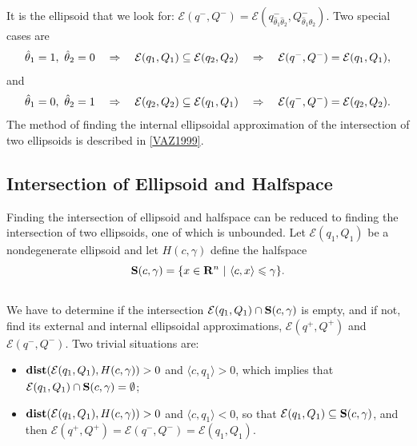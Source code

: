 \documentclass[letterpaper,10pt,english]{sphinxmanual}
\begin{document}
It is the ellipsoid that we look for:
${\mathcal E}(q^-,Q^-)={\mathcal E}(q^-_{\hat{\theta}_1\hat{\theta}_2},Q^-_{\hat{\theta}_1\hat{\theta}_2})$.
Two special cases are
\begin{gather}
\begin{split}\hat{\theta}_1=1, ~ \hat{\theta}_2=0 ~~~ \Rightarrow ~~~
{\mathcal E}(q_1,Q_1)\subseteq{\mathcal E}(q_2,Q_2) ~~~ \Rightarrow ~~~
{\mathcal E}(q^-,Q^-)={\mathcal E}(q_1,Q_1),\end{split}\notag
\end{gather}
and
\begin{gather}
\begin{split}\hat{\theta}_1=0, ~ \hat{\theta}_2=1 ~~~ \Rightarrow ~~~
{\mathcal E}(q_2,Q_2)\subseteq{\mathcal E}(q_1,Q_1) ~~~ \Rightarrow ~~~
{\mathcal E}(q^-,Q^-)={\mathcal E}(q_2,Q_2).\end{split}\notag
\end{gather}
The method of finding the internal ellipsoidal approximation of the
intersection of two ellipsoids is described in {\hyperref[chap_ellcalc:vaz1999]{{[}VAZ1999{]}}}.


\subsection{Intersection of Ellipsoid and Halfspace}
\label{chap_ellcalc:intersection-of-ellipsoid-and-halfspace}
Finding the intersection of ellipsoid and halfspace can be reduced to
finding the intersection of two ellipsoids, one of which is unbounded.
Let ${\mathcal E}(q_1,Q_1)$ be a nondegenerate ellipsoid and let
$H(c,\gamma)$ define the halfspace
\begin{gather}
\begin{split}{\bf S}(c,\gamma) = \{x\in{\bf R}^n ~|~ \langle c,x\rangle\leqslant\gamma\}.\end{split}\notag\\\begin{split}\end{split}\notag
\end{gather}
We have to determine if the intersection
${\mathcal E}(q_1,Q_1)\cap{\bf S}(c,\gamma)$ is empty, and if not,
find its external and internal ellipsoidal approximations,
${\mathcal E}(q^+,Q^+)$ and ${\mathcal E}(q^-,Q^-)$. Two
trivial situations are:
\begin{itemize}
\item {} 
${\bf dist}({\mathcal E}(q_1,Q_1),H(c,\gamma))>0$ and
$\langle c, q_1\rangle>0$, which implies that
${\mathcal E}(q_1,Q_1)\cap{\bf S}(c,\gamma)=\emptyset$;

\item {} 
${\bf dist}({\mathcal E}(q_1,Q_1),H(c,\gamma))>0$ and
$\langle c, q_1\rangle<0$, so that
${\mathcal E}(q_1,Q_1)\subseteq{\bf S}(c,\gamma)$, and then
${\mathcal E}(q^+,Q^+)={\mathcal E}(q^-,Q^-)={\mathcal E}(q_1,Q_1)$.

\end{itemize}
\end{document}
